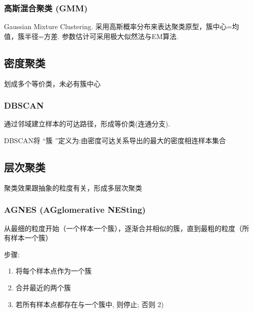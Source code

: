 \subsubsection{高斯混合聚类 (GMM)}
Gaussian Mixture Clustering. 采用高斯概率分布来表达聚类原型，簇中心=均值，簇半径=方差. 参数估计可采用极大似然法与EM算法. 

\subsection{密度聚类}
划成多个等价类，未必有簇中心

\subsubsection{DBSCAN}
通过邻域建立样本的可达路径，形成等价类(连通分支). 

DBSCAN将 “簇 ”定义为:由密度可达关系导出的最大的密度相连样本集合

\subsection{层次聚类}
聚类效果跟抽象的粒度有关，形成多层次聚类

\subsubsection{AGNES (AGglomerative NESting)}
从最细的粒度开始（一个样本一个簇），逐渐合并相似的簇，直到最粗的粒度（所有样本一个簇）

步骤:
\begin{enumerate}
    \item 将每个样本点作为一个簇
    \item 合并最近的两个簇
    \item 若所有样本点都存在与一个簇中, 则停止; 否则 2)
\end{enumerate}